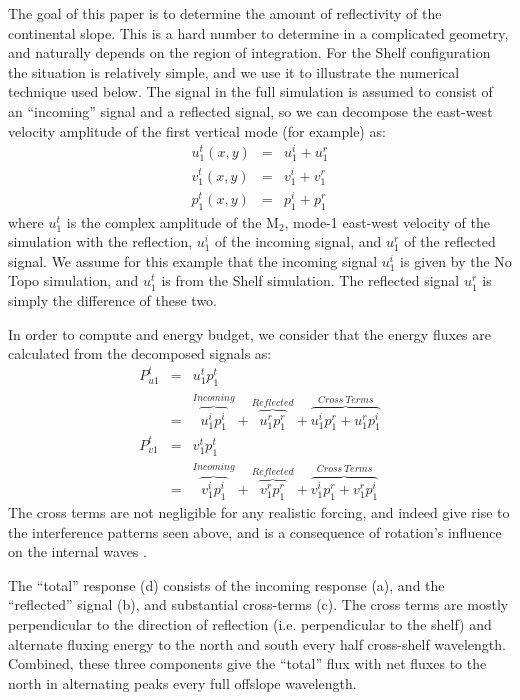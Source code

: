 \documentclass[10pt]{article}
\newcommand{\mn}[1]{{\sc #1}}
\begin{document}
The goal of this paper is to determine the amount of reflectivity of the continental slope.  This is a hard number to determine in a complicated geometry, and naturally depends on the region of integration.   For the \mn{Shelf} configuration the situation is relatively simple, and we use it to illustrate the numerical technique used below.  The signal in the full simulation is assumed to consist of an ``incoming'' signal and a reflected signal, so we can decompose the east-west velocity amplitude of the first vertical mode (for example) as:
\begin{eqnarray}
  u_{1}^{t}(x,y) &= &u_{1}^{i}+u_{1}^{r}\\
  v_{1}^{t}(x,y) &= &v_{1}^{i}+v_{1}^{r}\\
  p_{1}^{t}(x,y) &= &p_{1}^{i}+p_{1}^{r}
\end{eqnarray}
where $u_{1}^t$ is the  complex amplitude of the $\mathrm{M_2}$, mode-1 east-west velocity of the simulation with the reflection, $u_{1}^i$ of the incoming signal, and $u_{1}^r$ of the reflected signal.  We assume for this example that the incoming signal $u_{1}^i$ is given by the \mn{No Topo} simulation, and $u_{1}^t$ is from the \mn{Shelf} simulation.  The reflected signal $u_1^r$ is simply the difference of these two.  

In order to compute and energy budget, we consider that the energy fluxes are calculated from the decomposed signals as:
\begin{eqnarray}
  P_{u1}^t & = & u_1^t p_1^t \\
  &= & \overbrace{u_1^ip_1^i}^{Incoming} + \overbrace{u_1^rp_1^r}^{Reflected} + 
  \overbrace{u_1^ip_1^r + u_1^rp_1^i}^{Cross\ Terms} \\
  P_{v1}^t & = & v_1^t p_1^t \\
  &= & \overbrace{v_1^ip_1^i}^{Incoming} + \overbrace{v_1^rp_1^r}^{Reflected} + 
  \overbrace{v_1^ip_1^r + v_1^rp_1^i}^{Cross\ Terms} 
\end{eqnarray}
The cross terms are not negligible for any realistic forcing, and indeed give rise to the interference patterns seen above, and is a consequence of rotation's influence on the internal waves \citep{nashetal04a,martinietal07}. 

The ``total'' response (d) consists of the incoming response (a), and the ``reflected'' signal (b), and substantial cross-terms (c).  The cross terms are mostly perpendicular to the direction of reflection (i.e. perpendicular to the shelf) and alternate fluxing energy to the north and south every half cross-shelf wavelength.  Combined, these three components give the ``total'' flux with net fluxes to the north in alternating peaks every full offslope wavelength.  
\end{document}

